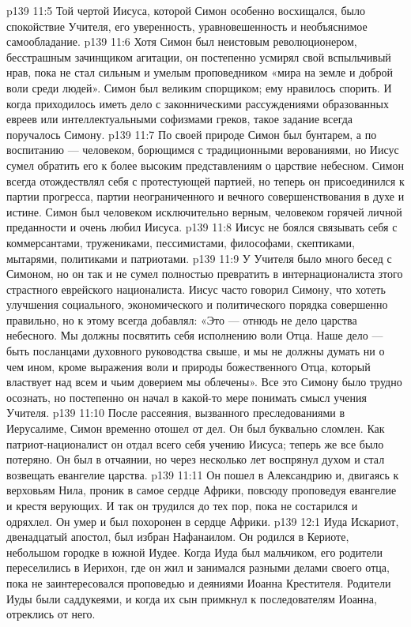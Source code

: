 \vs p139 11:5 \pc Той чертой Иисуса, которой Симон особенно восхищался, было спокойствие Учителя, его уверенность, уравновешенность и необъяснимое самообладание.
\vs p139 11:6 \pc Хотя Симон был неистовым революционером, бесстрашным зачинщиком агитации, он постепенно усмирял свой вспыльчивый нрав, пока не стал сильным и умелым проповедником «мира на земле и доброй воли среди людей». Симон был великим спорщиком; ему нравилось спорить. И когда приходилось иметь дело с законническими рассуждениями образованных евреев или интеллектуальными софизмами греков, такое задание всегда поручалось Симону.
\vs p139 11:7 По своей природе Симон был бунтарем, а по воспитанию --- человеком, борющимся с традиционными верованиями, но Иисус сумел обратить его к более высоким представлениям о царствие небесном. Симон всегда отождествлял себя с протестующей партией, но теперь он присоединился к партии прогресса, партии неограниченного и вечного совершенствования в духе и истине. Симон был человеком исключительно верным, человеком горячей личной преданности и очень любил Иисуса.
\vs p139 11:8 \pc Иисус не боялся связывать себя с коммерсантами, тружениками, пессимистами, философами, скептиками, мытарями, политиками и патриотами.
\vs p139 11:9 \pc У Учителя было много бесед с Симоном, но он так и не сумел полностью превратить в интернационалиста зтого страстного еврейского националиста. Иисус часто говорил Симону, что хотеть улучшения социального, экономического и политического порядка совершенно правильно, но к этому всегда добавлял: «Это --- отнюдь не дело царства небесного. Мы должны посвятить себя исполнению воли Отца. Наше дело --- быть посланцами духовного руководства свыше, и мы не должны думать ни о чем ином, кроме выражения воли и природы божественного Отца, который властвует над всем и чьим доверием мы облечены». Все это Симону было трудно осознать, но постепенно он начал в какой\hyp{}то мере понимать смысл учения Учителя.
\vs p139 11:10 \pc После рассеяния, вызванного преследованиями в Иерусалиме, Симон временно отошел от дел. Он был буквально сломлен. Как патриот\hyp{}националист он отдал всего себя учению Иисуса; теперь же все было потеряно. Он был в отчаянии, но через несколько лет воспрянул духом и стал возвещать евангелие царства.
\vs p139 11:11 Он пошел в Александрию и, двигаясь к верховьям Нила, проник в самое сердце Африки, повсюду проповедуя евангелие и крестя верующих. И так он трудился до тех пор, пока не состарился и одряхлел. Он умер и был похоронен в сердце Африки.
\vs p139 12:1 Иуда Искариот, двенадцатый апостол, был избран Нафанаилом. Он родился в Кериоте, небольшом городке в южной Иудее. Когда Иуда был мальчиком, его родители переселились в Иерихон, где он жил и занимался разными делами своего отца, пока не заинтересовался проповедью и деяниями Иоанна Крестителя. Родители Иуды были саддукеями, и когда их сын примкнул к последователям Иоанна, отреклись от него.
